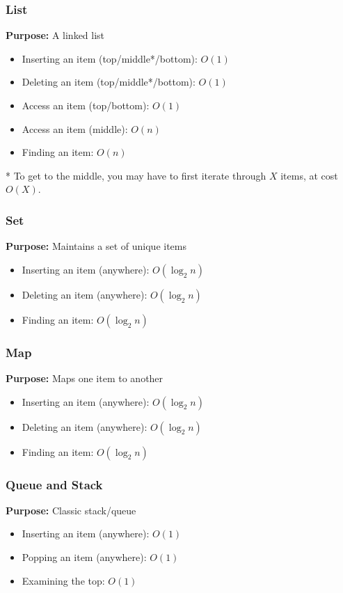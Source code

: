\documentclass[class=article, crop=false]{standalone}
\begin{document}
  \subsubsection{List} 
  \textbf{Purpose:} A linked list
  \begin{itemize}
    \item Inserting an item (top/middle*/bottom): $O(1)$
    \item Deleting an item (top/middle*/bottom): $O(1)$
    \item Access an item (top/bottom): $O(1)$
    \item Access an item (middle): $O(n)$
    \item Finding an item: $O(n)$
  \end{itemize}
  \begin{note}{*}
    To get to the middle, you may have to first iterate through $X$ items, at cost $O(X)$.
  \end{note}
  \subsubsection{Set} 
  \textbf{Purpose:} Maintains a set of unique items
  \begin{itemize}
    \item Inserting an item (anywhere): $O(\log_2n)$
    \item Deleting an item (anywhere): $O(\log_2n)$
    \item Finding an item: $O(\log_2n)$
  \end{itemize}
  \subsubsection{Map} 
  \textbf{Purpose:} Maps one item to another
  \begin{itemize}
    \item Inserting an item (anywhere): $O(\log_2n)$
    \item Deleting an item (anywhere): $O(\log_2n)$
    \item Finding an item: $O(\log_2n)$
  \end{itemize}
  \subsubsection{Queue and Stack}
  \textbf{Purpose:} Classic stack/queue
  \begin{itemize}
    \item Inserting an item (anywhere): $O(1)$
    \item Popping an item (anywhere): $O(1)$
    \item Examining the top: $O(1)$
  \end{itemize}
\end{document}
